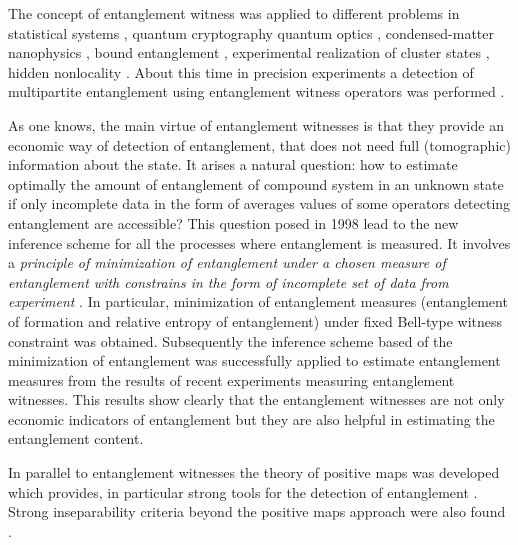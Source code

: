\documentclass[rmp,12pt,preprint]{revtex4-2}
\begin{document}
The concept of entanglement witness was applied to different problems in statistical
systems \cite {Cavalcanti05,WiesniakVB-Magnetic,LidarWBS,BruknerVZ2006}, quantum
cryptography \cite {CurtyGLL} quantum optics \cite
{StobinskaW-teor-s,stobinska-2006-20}, condensed-matter nanophysics
\cite {BlaauboerD}, bound entanglement \cite {HyllusABM}, experimental realization of cluster states
\cite {VallonePMMB2007}, hidden nonlocality \cite {MasanesLD2007}. About this
time in precision experiments a detection of multipartite entanglement
using entanglement witness operators was performed \cite
{Bourennane,Roos,Knill,Blatt,BarbieriMNMAM,Zeilinger-witness,Mikami-witness,Altepeter,LuZGGZSGYP2007}.

As one knows, the main virtue of entanglement witnesses is that they
provide an economic way of detection of entanglement, that does not
need full (tomographic) information about the state. It arises a
natural question: how to estimate optimally the amount of entanglement
of compound system in an unknown state if only incomplete data in the
form of averages values of some operators detecting entanglement are
accessible? This question posed in 1998 lead to the new inference
scheme for all the processes where entanglement is measured. It
involves a {\it principle of minimization of entanglement under a
  chosen measure of entanglement with constrains in the form of
  incomplete set of data from experiment} \cite {Jaynes}. In
particular, minimization of entanglement measures (entanglement of
formation and relative entropy of entanglement) under fixed Bell-type
witness constraint was obtained. Subsequently  the inference scheme based
of the minimization of entanglement was successfully applied \cite
{Reimpell,EisertBA,PlenioA} to estimate entanglement measures from the
results of recent experiments measuring entanglement witnesses. This
results show clearly that the entanglement witnesses are not only
economic indicators of entanglement but they are also helpful in
estimating the entanglement content.

In parallel to entanglement witnesses the theory of positive maps was
developed which provides, in particular strong tools for the detection
of entanglement \cite
{Terhal2000-laa,Kossakowski,BenattiFPquan_dyn,MPiani,PianiM,ChruscinskiK,Hall2006,Breuer2006-prl,CavesDFS,reduction,CerfAG,Majewski}.
Strong inseparability criteria beyond the positive maps approach were
also found
\cite{Rudolph,HHH02-permut,MintertKB2004-multi,OGuehne,HofmannT,ChenWu,ClarisseW2005-permut,GuhneHGE2007,DeviPR2007}.
\end{document}

